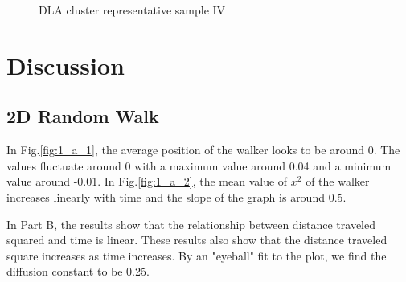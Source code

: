 \documentclass[notitlepage,aps,prd,nofootinbib]{revtex4-1}
\begin{document}
\begin{figure}[!h]
\centering
{}
\caption{DLA cluster representative sample IV}
\label{dla4}
\end{figure}


\clearpage
\section{Discussion}
\label{sec:Conclusions}
\subsection{2D Random Walk}
In Fig.\ref{fig:1_a_1}, the average position of the walker looks to be around 0. The values fluctuate around 0 with a maximum value around 0.04 and a minimum value around -0.01. In Fig.\ref{fig:1_a_2}, the mean value of $x^2$ of the walker increases linearly with time and the slope of the graph is around 0.5.

In Part B, the results show that the relationship between distance traveled squared and time is linear. These results also show that the distance traveled square increases as time increases. By an "eyeball" fit to the plot, we find the diffusion constant to be 0.25.
\end{document}
